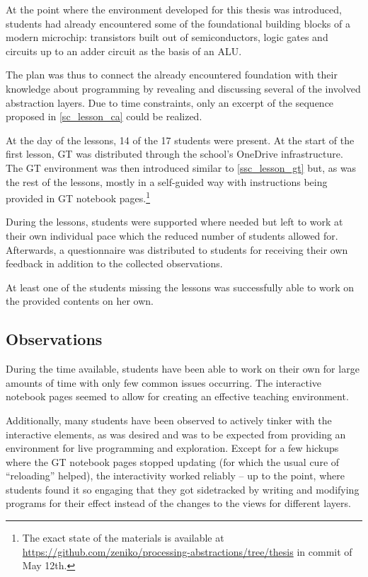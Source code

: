 At the point where the environment developed for this thesis was introduced, students had already encountered some of the foundational building blocks of a modern microchip: transistors built out of semiconductors, logic gates and circuits up to an adder circuit as the basis of an \ac{ALU}.

The plan was thus to connect the already encountered foundation with their knowledge about programming by revealing and discussing several of the involved abstraction layers. Due to time constraints, only an excerpt of the sequence proposed in \ref{sc_lesson_ca} could be realized.

At the day of the lessons, 14 of the 17 students were present. At the start of the first lesson, \ac{GT} was distributed through the school's OneDrive infrastructure. The \ac{GT} environment was then introduced similar to \ref{ssc_lesson_gt} but, as was the rest of the lessons, mostly in a self-guided way with instructions being provided in \ac{GT} notebook pages.\footnote{The exact state of the materials is available at \url{https://github.com/zeniko/processing-abstractions/tree/thesis} in commit  of May 12th.}

During the lessons, students were supported where needed but left to work at their own individual pace which the reduced number of students allowed for. Afterwards, a questionnaire was distributed to students for receiving their own feedback in addition to the collected observations.

At least one of the students missing the lessons was successfully able to work on the provided contents on her own.


\subsection{Observations}

During the time available, students have been able to work on their own for large amounts of time with only few common issues occurring. The interactive notebook pages seemed to allow for creating an effective teaching environment.

Additionally, many students have been observed to actively tinker with the interactive elements, as was desired and was to be expected from providing an environment for live programming and exploration. Except for a few hickups where the \ac{GT} notebook pages stopped updating (for which the usual cure of ``reloading'' helped), the interactivity worked reliably -- up to the point, where students found it so engaging that they got sidetracked by writing and modifying programs for their effect instead of the changes to the views for different layers.

